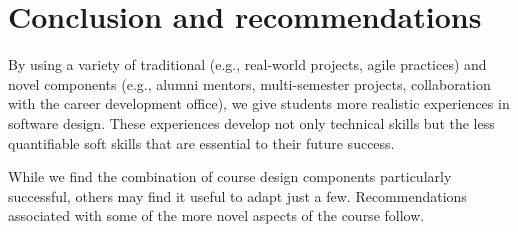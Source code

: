\section{Conclusion and recommendations}

By using a variety of traditional (e.g., real-world projects, agile
practices) and novel components (e.g., alumni mentors, multi-semester
projects, collaboration with the career development office), we
give students more realistic experiences in software design.  These
experiences develop not only technical skills but the less quantifiable
soft skills that are essential to their future success.

While we find the combination of course design components particularly
successful, others may find it useful to adapt just a few.  Recommendations
associated with some of the more novel aspects of the course follow.



%

